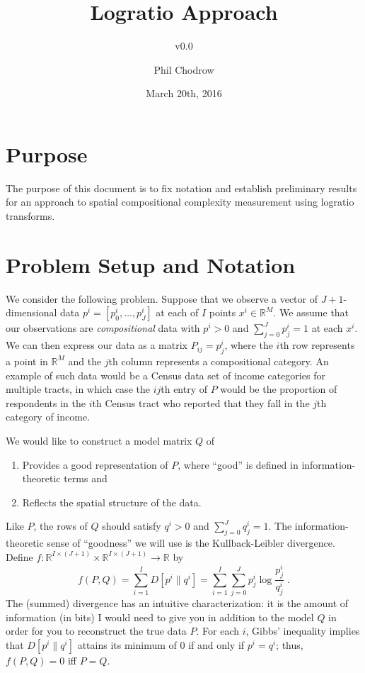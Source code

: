 \documentclass[english]{scrartcl}
\title{Logratio Approach}
\subtitle{v0.0}
\author{Phil Chodrow}
\date{March 20th, 2016}
\newcommand\R[0]{\mathbb{R}}
\begin{document}
\maketitle

\section{Purpose}
	The purpose of this document is to fix notation and establish preliminary results for an approach to spatial compositional complexity measurement using logratio transforms.

\section{Problem Setup and Notation}
	We consider the following problem. Suppose that we observe a vector of $J+1$-dimensional  data $p^i = [p^i_0,\ldots,p^i_J]$ at each of $I$ points $x^i \in \R^M$. We assume that our observations are \textit{compositional} data with $p^i>0$ and $\sum_{j=0}^J p^i_j =1$ at each $x^i$. We can then express our data as a matrix $P_{ij} = p^i_j$, where the $i$th row represents a point in $\R^M$ and the $j$th column represents a compositional category. An example of such data would be a Census data set of income categories for multiple tracts, in which case the $ij$th entry of $P$ would be the proportion of respondents in the $i$th Census tract who reported that they fall in the $j$th category of income.

	We would like to construct a model matrix $Q$ of
	\begin{enumerate}
		\item Provides a good representation of $P$, where ``good'' is defined in information-theoretic terms and
		\item Reflects the spatial structure of the data.
	\end{enumerate}
	Like $P$, the rows of $Q$ should satisfy $q^i > 0$ and $\sum_{j = 0}^J q^i_j = 1$.
	The information-theoretic sense of ``goodness'' we will use is the Kullback-Leibler divergence. Define $f:\R^{I \times (J+1)} \times \R^{I \times (J+1)} \rightarrow \R$ by
	\begin{equation}
		f(P,Q) = \sum_{i=1}^I D[p^i\|q^i] = \sum_{i = 1}^I \sum_{j = 0}^J p^i_j \log \frac{p^i_j}{q^i_j}\;. \label{objective}
	\end{equation}
	The (summed) divergence has an intuitive characterization: it is the amount of information (in bits) I would need to give you in addition to the model $Q$ in order for you to reconstruct the true data $P$. For each $i$, Gibbs' inequality implies that $D[p^i\|q^i]$ attains its minimum of $0$ if and only if $p^i = q^i$; thus, $f(P,Q) = 0$ iff $P = Q$.
\end{document}
